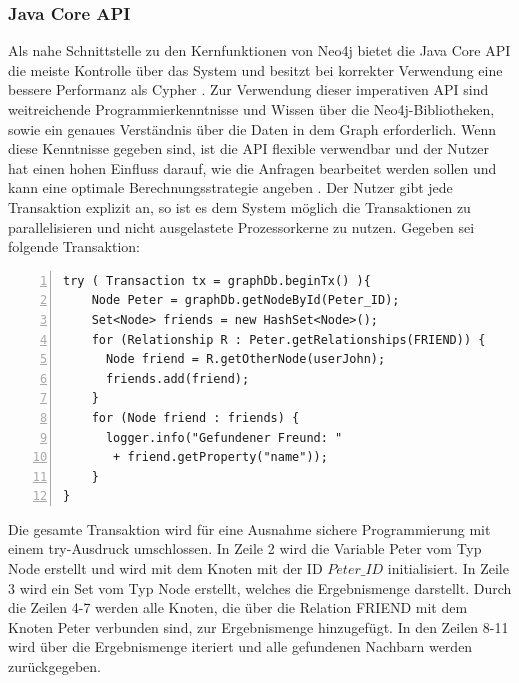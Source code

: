 \subsubsection{Java Core API}
Als nahe Schnittstelle zu den Kernfunktionen von Neo4j bietet die Java Core API die meiste Kontrolle über das System und besitzt bei korrekter Verwendung eine bessere Performanz als Cypher \parencite{vukotic2015neo4j}. Zur Verwendung dieser imperativen API sind weitreichende Programmierkenntnisse und Wissen über die Neo4j-Bibliotheken, sowie ein genaues Verständnis  über die Daten in dem Graph erforderlich. Wenn diese Kenntnisse gegeben sind, ist die API flexible verwendbar  und der Nutzer hat einen hohen Einfluss darauf, wie die Anfragen bearbeitet werden sollen und kann eine optimale Berechnungsstrategie angeben \parencite{vukotic2015neo4j}. Der Nutzer gibt jede Transaktion explizit an, so ist es dem System möglich die Transaktionen zu parallelisieren und nicht ausgelastete Prozessorkerne zu nutzen. Gegeben sei folgende Transaktion: \newline
\begin{Verbatim}[frame=single,numbers=left,xleftmargin=5mm]
try ( Transaction tx = graphDb.beginTx() ){ 
	Node Peter = graphDb.getNodeById(Peter_ID);
	Set<Node> friends = new HashSet<Node>();
	for (Relationship R : Peter.getRelationships(FRIEND)) {  
	  Node friend = R.getOtherNode(userJohn);
	  friends.add(friend);
	}
	for (Node friend : friends) {
	  logger.info("Gefundener Freund: "
	   + friend.getProperty("name")); 
	}
}
\end{Verbatim}
\noindent Die gesamte Transaktion wird für eine Ausnahme sichere Programmierung mit einem try-Ausdruck umschlossen. In Zeile 2 wird die Variable Peter vom Typ Node erstellt und wird mit dem Knoten mit der ID $Peter\_ID$ initialisiert. In Zeile 3 wird ein Set vom Typ Node erstellt, welches die Ergebnismenge darstellt. Durch die Zeilen 4-7 werden alle Knoten, die über die Relation FRIEND mit dem Knoten Peter verbunden sind, zur Ergebnismenge hinzugefügt. In den Zeilen 8-11 wird über die Ergebnismenge  iteriert und  alle gefundenen Nachbarn werden zurückgegeben. 

